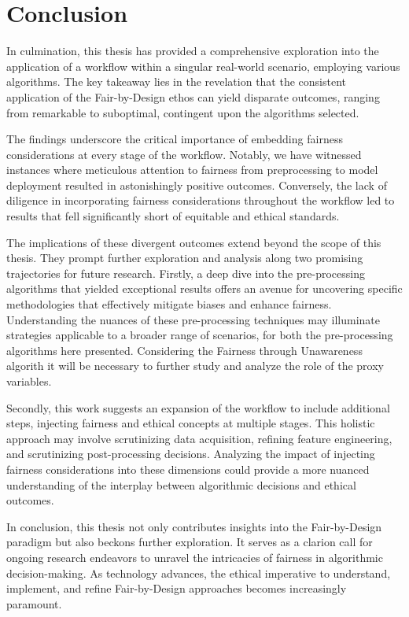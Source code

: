 \chapter{Conclusion}
\label{chap:conclusions}

In culmination, this thesis has provided a comprehensive exploration into the application of a workflow within a singular real-world scenario, employing various algorithms. The key takeaway lies in the revelation that the consistent application of the Fair-by-Design ethos can yield disparate outcomes, ranging from remarkable to suboptimal, contingent upon the algorithms selected.

The findings underscore the critical importance of embedding fairness considerations at every stage of the workflow. Notably, we have witnessed instances where meticulous attention to fairness from preprocessing to model deployment resulted in astonishingly positive outcomes. Conversely, the lack of diligence in incorporating fairness considerations throughout the workflow led to results that fell significantly short of equitable and ethical standards.

The implications of these divergent outcomes extend beyond the scope of this thesis. They prompt further exploration and analysis along two promising trajectories for future research. Firstly, a deep dive into the pre-processing algorithms that yielded exceptional results offers an avenue for uncovering specific methodologies that effectively mitigate biases and enhance fairness. Understanding the nuances of these pre-processing techniques may illuminate strategies applicable to a broader range of scenarios, for both the pre-processing algorithms here presented. Considering the Fairness through Unawareness algorith it will be necessary to further study and analyze the role of the proxy variables.

Secondly, this work suggests an expansion of the workflow to include additional steps, injecting fairness and ethical concepts at multiple stages. This holistic approach may involve scrutinizing data acquisition, refining feature engineering, and scrutinizing post-processing decisions. Analyzing the impact of injecting fairness considerations into these dimensions could provide a more nuanced understanding of the interplay between algorithmic decisions and ethical outcomes.

In conclusion, this thesis not only contributes insights into the Fair-by-Design paradigm but also beckons further exploration. It serves as a clarion call for ongoing research endeavors to unravel the intricacies of fairness in algorithmic decision-making. As technology advances, the ethical imperative to understand, implement, and refine Fair-by-Design approaches becomes increasingly paramount.

